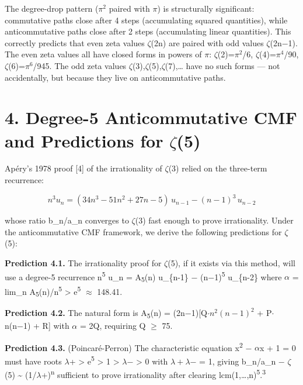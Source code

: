 \documentclass[11pt]{article}
\begin{document}
The degree-drop pattern (\(\pi^{2}\) paired with \(\pi\)) is
structurally significant: commutative paths close after 4 steps
(accumulating squared quantities), while anticommutative paths close
after 2 steps (accumulating linear quantities). This correctly predicts
that even zeta values \(\zeta\)(2n) are paired with odd values
\(\zeta\)(2n−1). The even zeta values all have closed forms in powers of
\(\pi\): \(\zeta\)(2)=\(\pi^{2}\)/6, \(\zeta\)(4)=\(\pi^{4}\)/90,
\(\zeta\)(6)=\(\pi^{6}\)/945. The odd zeta values
\(\zeta\)(3),\(\zeta\)(5),\(\zeta\)(7),\ldots{} have no such forms ---
not accidentally, but because they live on anticommutative paths.

\hypertarget{degree-5-anticommutative-cmf-and-predictions-for-5}{%
\section{\texorpdfstring{4. Degree-5 Anticommutative CMF and Predictions
for
\(\zeta\)(5)}{4. Degree-5 Anticommutative CMF and Predictions for (5)}}\label{degree-5-anticommutative-cmf-and-predictions-for-5}}

Apéry's 1978 proof {[}4{]} of the irrationality of \(\zeta\)(3) relied
on the three-term recurrence:

\[n^3 u_n = (34n^3 - 51n^2 + 27n - 5)\, u_{n-1} - (n-1)^3\, u_{n-2}\]

whose ratio b\_n/a\_n converges to \(\zeta\)(3) fast enough to prove
irrationality. Under the anticommutative CMF framework, we derive the
following predictions for \(\zeta\)(5):

\textbf{Prediction 4.1.} The irrationality proof for \(\zeta\)(5), if it
exists via this method, will use a degree-5 recurrence
n\textsuperscript{5} u\_n = A\textsubscript{5}(n) u\_\{n-1\} −
(n−1)\textsuperscript{5} u\_\{n-2\} where \(\alpha\) = lim\_n
A\textsubscript{5}(n)/n\textsuperscript{5} \textgreater{}
e\textsuperscript{5} \(\approx\) 148.41.

\textbf{Prediction 4.2.} The natural form is A\textsubscript{5}(n) =
(2n−1){[}Q\(\cdot n^{2}(n−1)^{2}\) + P\(\cdot\)n(n−1) + R{]} with
\(\alpha\) = 2Q, requiring Q \(\geq\) 75.

\textbf{Prediction 4.3.} (Poincaré-Perron) The characteristic equation
x\textsuperscript{2} − \(\alpha\)x + 1 = 0 must have roots \(\lambda\)+
\textgreater{} e\textsuperscript{5} \textgreater{} 1 \textgreater{}
\(\lambda\)− \textgreater{} 0 with \(\lambda+\lambda\)− = 1, giving
\textbar b\_n/a\_n − \(\zeta\)(5)\textbar{} \textasciitilde{}
(1/\(\lambda\)+)\textsuperscript{n} sufficient to prove irrationality
after clearing lcm(1,\ldots,n)\textsuperscript{5}.\textsuperscript{3}
\end{document}
